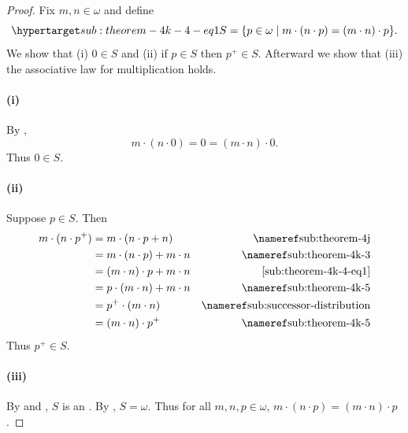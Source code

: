 \documentclass{report}
\begin{document}
\begin{proof}


  Fix $m, n \in \omega$ and define
    \begin{equation}
      \hyperlabel{sub:theorem-4k-4-eq1}
      S = \{p \in \omega \mid m \cdot (n \cdot p) = (m \cdot n) \cdot p\}.
    \end{equation}
  We show that (i) $0 \in S$ and (ii) if $p \in S$ then $p^+ \in S$.
  Afterward we show that (iii) the associative law for multiplication holds.

  \paragraph{(i)}%

    By ,
      $$m \cdot (n \cdot 0) = 0 = (m \cdot n) \cdot 0.$$
    Thus $0 \in S$.

  \paragraph{(ii)}%

    Suppose $p \in S$.
    Then
      \begin{align*}
        m \cdot (n \cdot p^+)
          & = m \cdot (n \cdot p + n) & \textref{sub:theorem-4j} \\
          & = m \cdot (n \cdot p) + m \cdot n & \textref{sub:theorem-4k-3} \\
          & = (m \cdot n) \cdot p + m \cdot n & \eqref{sub:theorem-4k-4-eq1} \\
          & = p \cdot (m \cdot n) + m \cdot n & \textref{sub:theorem-4k-5} \\
          & = p^+ \cdot (m \cdot n) & \textref{sub:successor-distribution} \\
          & = (m \cdot n) \cdot p^+ & \textref{sub:theorem-4k-5}
      \end{align*}
    Thus $p^+ \in S$.

  \paragraph{(iii)}%

    By  and , $S$
      is an .
    By , $S = \omega$.
    Thus for all $m, n, p \in \omega$,
      $m \cdot (n \cdot p) = (m \cdot n) \cdot p$.

\end{proof}
\end{document}
